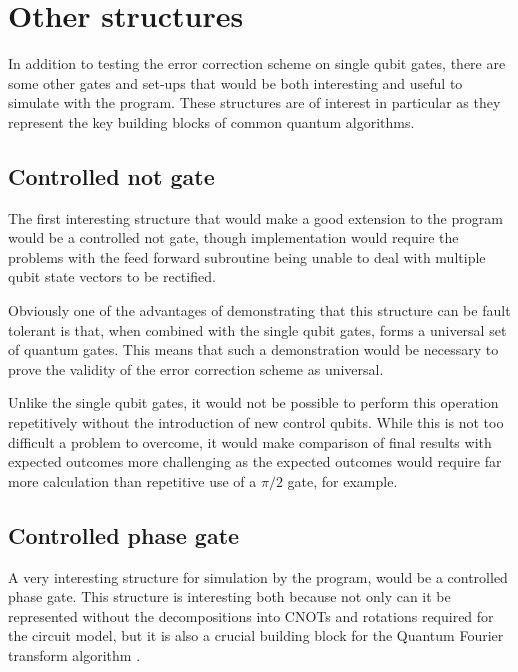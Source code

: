 \section{Other structures}

In addition to testing the error correction scheme on single qubit gates, there are some other gates and set-ups that would be both interesting and useful to simulate with the program. These structures are of interest in particular as they represent the key building blocks of common quantum algorithms.

\subsection{Controlled not gate}

The first interesting structure that would make a good extension to the program would be a controlled not gate, though implementation would require the problems with the feed forward subroutine being unable to deal with multiple qubit state vectors to be rectified.

Obviously one of the advantages of demonstrating that this structure can be fault tolerant is that, when combined with the single qubit gates, forms a universal set of quantum gates. This means that such a demonstration would be necessary to prove the validity of the error correction scheme as universal.

Unlike the single qubit gates, it would not be possible to perform this operation repetitively without the introduction of new control qubits. While this is not too difficult a problem to overcome, it would make comparison of final results with expected outcomes more challenging as the expected outcomes would require far more calculation than repetitive use of a $\pi / 2$ gate, for example.


\subsection{Controlled phase gate}

A very interesting structure for simulation by the program, would be a controlled phase gate. This structure is interesting both because not only can it be represented without the decompositions into CNOTs and rotations required for the circuit model, but it is also a crucial building block for the Quantum Fourier transform algorithm \citep{raussendorf_measurement-based_2003}. 

